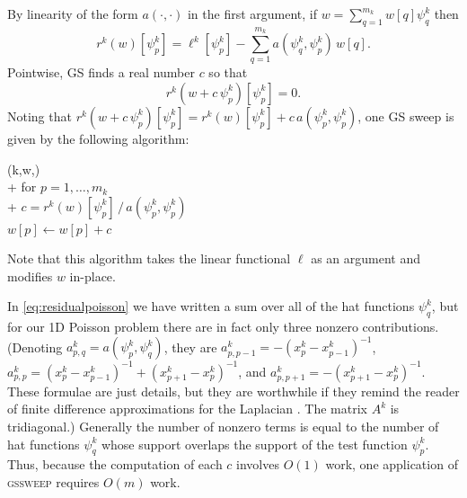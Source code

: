 \documentclass[letterpaper,final,12pt,reqno]{amsart}
\numberwithin{equation}{section}
\numberwithin{figure}{section}
\numberwithin{table}{section}
\begin{document}
By linearity of the form $a(\cdot,\cdot)$ in the first argument, if $w = \sum_{q=1}^{m_k} w[q] \psi_q^k$ then
\begin{equation}
  r^k(w)[\psi_p^k] = \ell^k[\psi_p^k] - \sum_{q=1}^{m_k} a(\psi_q^k,\psi_p^k) \,w[q].  \label{eq:residualpoisson}
\end{equation}
Pointwise, GS finds a real number $c$ so that
\begin{equation}
  r^k(w+c\,\psi_p^k)[\psi_p^k] = 0.  \label{eq:gaussseidelpoint}
\end{equation}
Noting that $r^k(w+c\,\psi_p^k)[\psi_p^k] = r^k(w)[\psi_p^k] + c\, a(\psi_p^k,\psi_p^k)$, one GS sweep is given by the following algorithm:
\begin{pseudo*}
(k,w,\ell)\text{:} \\+
    for $p=1,\dots,m_k$ \\+
        $\displaystyle c = r^k(w)[\psi_p^k]\, \big/ \,a(\psi_p^k,\psi_p^k)$  \qquad {} \\
        $w[p] \gets w[p] + c$
\end{pseudo*}
Note that this algorithm takes the linear functional $\ell$ as an argument and modifies $w$ in-place.

In \eqref{eq:residualpoisson} we have written a sum over all of the hat functions $\psi_q^k$, but for our 1D Poisson problem there are in fact only three nonzero contributions.  (Denoting $a_{p,q}^k = a(\psi_p^k,\psi_q^k)$, they are $a_{p,p-1}^k = -(x_p^k-x_{p-1}^k)^{-1}$, $a_{p,p}^k = (x_p^k-x_{p-1}^k)^{-1} + (x_{p+1}^k-x_p^k)^{-1}$, and $a_{p,p+1}^k = -(x_{p+1}^k-x_p^k)^{-1}$.  These formulae are just details, but they are worthwhile if they remind the reader of finite difference approximations for the Laplacian \cite[for example]{Bueler2021}.  The matrix $A^k$ is tridiagonal.)  Generally the number of nonzero terms is equal to the number of hat functions $\psi_q^k$ whose support overlaps the support of the test function $\psi_p^k$.  Thus, because the computation of each $c$ involves $O(1)$ work, one application of \textsc{gssweep} requires $O(m)$ work.
\end{document}

